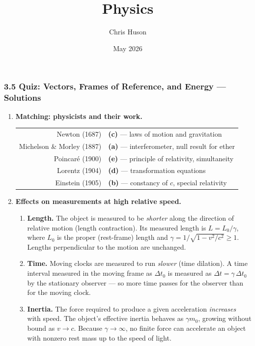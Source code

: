 \documentclass[12pt, twoside]{article}
\title{Physics}
\author{Chris Huson}
\date{May 2026}
\begin{document}
\subsubsection*{3.5 Quiz: Vectors, Frames of Reference, and Energy --- Solutions}

\begin{enumerate}

\item \textbf{Matching: physicists and their work.}

\vspace{0.2cm}

\begin{tabular}{rl}
Newton (1687) & \textbf{(c)} --- laws of motion and gravitation \\[0.25cm]
Michelson \& Morley (1887) & \textbf{(a)} --- interferometer, null result for ether \\[0.25cm]
Poincaré (1900) & \textbf{(e)} --- principle of relativity, simultaneity \\[0.25cm]
Lorentz (1904) & \textbf{(d)} --- transformation equations \\[0.25cm]
Einstein (1905) & \textbf{(b)} --- constancy of $c$, special relativity \\
\end{tabular}

\vspace{0.6cm}

\item \textbf{Effects on measurements at high relative speed.}

\begin{enumerate}[itemsep=0.4cm]
\item \textbf{Length.} The object is measured to be \emph{shorter} along the direction of relative motion (length contraction). Its measured length is $L = L_0 / \gamma$, where $L_0$ is the proper (rest-frame) length and $\gamma = 1/\sqrt{1 - v^2/c^2} \ge 1$. Lengths perpendicular to the motion are unchanged.

\item \textbf{Time.} Moving clocks are measured to run \emph{slower} (time dilation). A time interval measured in the moving frame as $\Delta t_0$ is measured as $\Delta t = \gamma \, \Delta t_0$ by the stationary observer --- so more time passes for the observer than for the moving clock.

\item \textbf{Inertia.} The force required to produce a given acceleration \emph{increases} with speed. The object's effective inertia behaves as $\gamma m_0$, growing without bound as $v \to c$. Because $\gamma \to \infty$, no finite force can accelerate an object with nonzero rest mass up to the speed of light.
\end{enumerate}


\end{enumerate}
\end{document}
